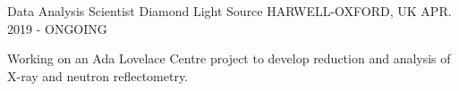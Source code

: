\begin{cventries}
  \cventry
    {Data Analysis Scientist}
    {Diamond Light Source}
    {HARWELL-OXFORD, UK}
    {APR. 2019 - ONGOING}
    {
      \begin{cvitems}
        \item {Working on an Ada Lovelace Centre project to develop reduction and analysis of X-ray and neutron reflectometry.}
      \end{cvitems}
    }
\end{cventries}
